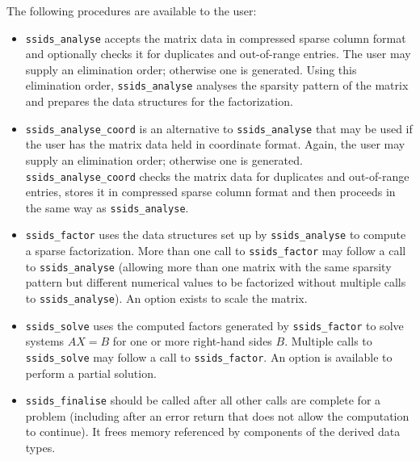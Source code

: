 \documentclass{spral}
\begin{document}
\medskip

\noindent
The following procedures are available to the user:
\begin{itemize}
\item {\tt ssids\_analyse} accepts the matrix data in compressed
sparse column format and optionally checks it for duplicates and  out-of-range entries.
The user may supply an elimination order; otherwise
one is generated. Using this elimination order,
{\tt ssids\_analyse}  analyses the sparsity pattern of
the matrix and prepares the data structures for the factorization.

 \item {\tt ssids\_analyse\_coord} is an alternative to
{\tt ssids\_analyse} that may be used if the user has
the matrix data held in coordinate
format. Again, the user may supply an elimination order; otherwise
one is generated. {\tt ssids\_analyse\_coord}
checks the matrix data  for duplicates and  out-of-range entries,
stores
it in compressed sparse column format and then proceeds
in the same way as {\tt ssids\_analyse}.

\item {\tt ssids\_factor} uses the data structures
set up by {\tt ssids\_analyse} to compute a sparse
factorization. More than one call to  {\tt ssids\_factor}
may follow a call to {\tt ssids\_analyse} (allowing more than
one matrix with the same sparsity pattern but different
numerical values to be factorized without multiple calls to
{\tt ssids\_analyse}).
An option exists to scale the matrix.

\item {\tt ssids\_solve} uses the computed factors generated
by  {\tt ssids\_factor}
to solve systems ${AX= B}$
for one or more right-hand sides $B$.
Multiple calls to {\tt ssids\_solve} may follow a call to
{\tt ssids\_factor}.
An option is available to perform a partial solution.

\item {\tt ssids\_finalise} should be called after all other calls
are complete for a problem (including after an error
return that does not allow the computation
to continue). It frees memory referenced by components of
the derived data types.
\end{itemize}
\end{document}
